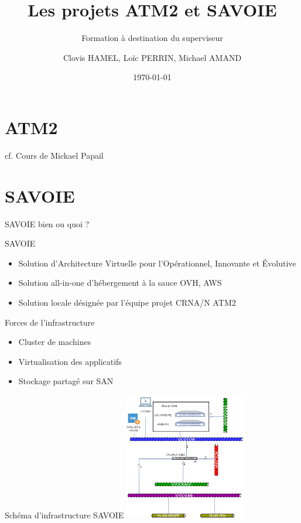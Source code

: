 \documentclass[10pt]{beamer}
\title{Les projets ATM2 et SAVOIE}
\subtitle{Formation à destination du superviseur}
\author{Clovis HAMEL, Lo\"{i}c PERRIN, Michael AMAND}
\date{\today}
\begin{document}
\begin{frame}
  \titlepage
\end{frame}

\begin{frame}{}
  \tableofcontents
\end{frame}



\section{ATM2}
cf. Cours de Mickael Papail

\section{SAVOIE}

\begin{frame}{SAVOIE bien ou quoi ?}
\begin{block}{SAVOIE}
\begin{itemize}
\item Solution d’Architecture Virtuelle pour l’Opérationnel, Innovante et Évolutive
\item Solution all-in-one d'hébergement à la sauce OVH, AWS
\item Solution locale désignée par l'équipe projet CRNA/N ATM2
\end{itemize}
\end{block}
\begin{block}{Forces de l'infrastructure}
\begin{itemize}
\item Cluster de machines \pause
\item Virtualisation des applicatifs \pause
\item Stockage partagé sur SAN \pause 
\end{itemize}
\end{block}
\end{frame}

\begin{center}
\begin{frame}{Schéma d'infrastructure SAVOIE}
\includegraphics[width=200px]{Schemas/SAVOIE.png}
\end{frame}
\end{center}
\end{document}
